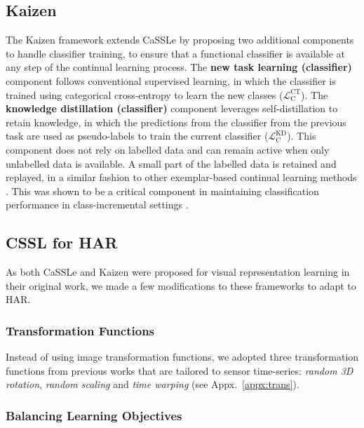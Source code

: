 \subsection{Kaizen}
The Kaizen framework \cite{tang2023practical} extends CaSSLe by proposing two additional components to handle classifier training, to ensure that a functional classifier is available at any step of the continual learning process.
The \textbf{new task learning (classifier)} component follows conventional supervised learning, in which the classifier is trained using categorical cross-entropy to learn the new classes ($\mathcal{L}^{\mathrm{CT}}_{\mathrm{C}}$).
The \textbf{knowledge distillation (classifier)} component leverages self-distillation to retain knowledge, in which the predictions from the classifier from the previous task are used as pseudo-labels to train the current classifier ($\mathcal{L}^{\mathrm{KD}}_{\mathrm{C}}$). This component does not rely on labelled data and can remain active when only unlabelled data is available.
A small part of the labelled data is retained and replayed, in a similar fashion to other exemplar-based continual learning methods \cite{rebuffi2017icarl, isele2018selective, rolnick2019experience, mittal2021essentials}. This was shown to be a critical component in maintaining classification performance in class-incremental settings \cite{de2021continual}.

\subsection{CSSL for HAR}
\label{subsec:balancing}
As both CaSSLe and Kaizen were proposed for visual representation learning in their original work, we made a few modifications to these frameworks to adapt to HAR.

\subsubsection{Transformation Functions}
Instead of using image transformation functions, we adopted three transformation functions from previous works \cite{har_transformations, multi_self_har, tang2020exploring, tang2021selfhar} that are tailored to sensor time-series: \emph{random 3D rotation}, \emph{random scaling} and \emph{time warping} (see Appx.~\ref{appx:trans}).

\subsubsection{Balancing Learning Objectives}

